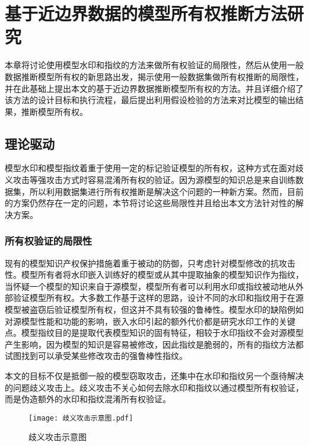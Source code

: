 
\chapter{基于近边界数据的模型所有权推断方法研究}\label{4}

本章将讨论使用模型水印和指纹的方法来做所有权验证的局限性，然后从使用一般数据推断模型所有权的新思路出发，揭示使用一般数据集做所有权推断的局限性，并在此基础上提出本文的基于近边界数据推断模型所有权的方法。并且详细介绍了该方法的设计目标和执行流程，最后提出利用假设检验的方法来对比模型的输出结果，推断模型所有权。

\section{理论驱动}\label{4.1}

模型水印和模型指纹着重于使用一定的标记验证模型的所有权，这种方式在面对歧义攻击等强攻击方式时容易混淆所有权的验证。因为源模型的知识总是来自训练数据集，所以利用数据集进行所有权推断是解决这个问题的一种新方案。然而，目前的方案仍然存在一定的问题，本节将讨论这些局限性并且给出本文方法针对性的解决方案。

\subsection{所有权验证的局限性}

现有的模型知识产权保护措施着重于被动的防御，只考虑针对模型修改的抗攻击性。模型所有者将水印嵌入训练好的模型或从其中提取抽象的模型知识作为指纹，当怀疑一个模型的知识来自于源模型，模型所有者可以利用水印或指纹被动地从外部验证模型所有权。大多数工作基于这样的思路，设计不同的水印和指纹用于在源模型被盗窃后验证模型所有权，但这并不具有较强的鲁棒性。模型水印的缺陷例如对源模型性能和功能的影响，嵌入水印引起的额外代价都是研究水印工作的关键点。模型指纹目的是提取代表模型知识的固有特征，相较于水印指纹不会对源模型产生影响，因为模型的知识是容易被修改，因此指纹是脆弱的，所有的指纹方法都试图找到可以承受某些修改攻击的强鲁棒性指纹。

本文的目标不仅是抵御一般的模型窃取攻击，还集中在水印和指纹另一个亟待解决的问题歧义攻击上。歧义攻击不关心如何去除水印和指纹以通过模型所有权验证，而是伪造额外的水印和指纹混淆所有权验证。

\begin{figure}[htbp]%
	\centering
	\texttt{[image: 歧义攻击示意图.pdf]}
	\setlength{\abovecaptionskip}{5mm} %
	\caption{歧义攻击示意图}
	\label{歧义攻击示意图}
	\end {figure}

